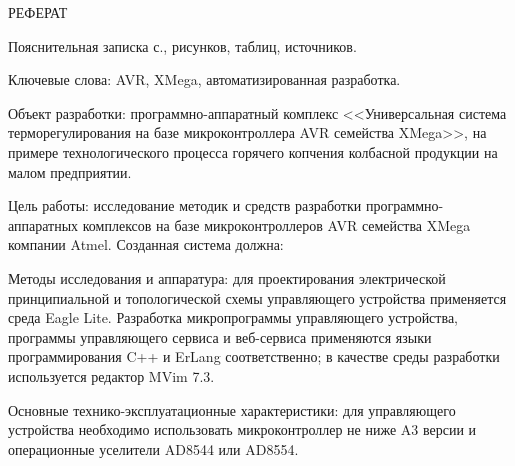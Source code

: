 \begin{center}\MakeUppercase{Реферат}\end{center}

Пояснительная записка  с.,  рисунков,  таблиц,
 источников.


Ключевые слова: AVR, XMega, автоматизированная разработка.


Объект разработки: программно-аппаратный комплекс <<Универсальная система терморегулирования
 на базе микроконтроллера AVR семейства XMega>>, на примере технологического процесса горячего копчения
колбасной продукции на малом предприятии.

Цель работы: исследование методик и средств разработки программно-аппаратных комплексов на базе
микроконтроллеров AVR семейства XMega компании Atmel. Созданная система должна:



Методы исследования и аппаратура: для проектирования электрической принципиальной и
топологической схемы управляющего устройства применяется среда Eagle Lite. Разработка
микропрограммы управляющего устройства, программы управляющего сервиса и веб-сервиса применяются
языки программирования C++ и ErLang соответственно; в качестве среды разработки используется
редактор MVim 7.3.


Основные технико-эксплуатационные характеристики: для управляющего устройства необходимо использовать
микроконтроллер не ниже A3 версии и операционные уселители AD8544 или AD8554.


\newpage{}









